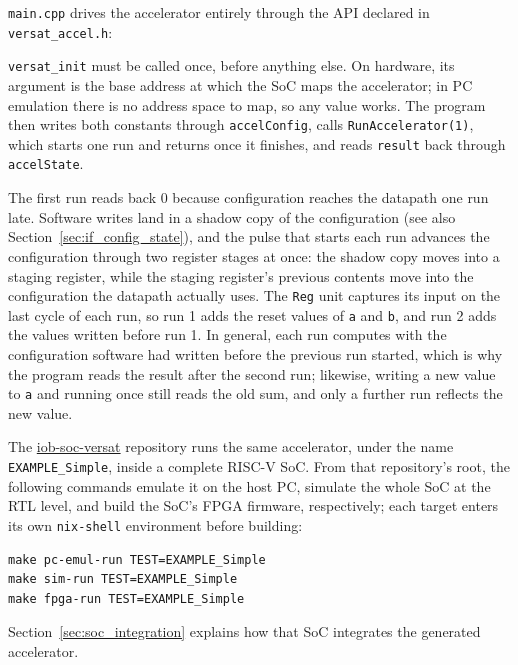 %

\texttt{main.cpp} drives the accelerator entirely through the API declared in \texttt{versat\_accel.h}:



\texttt{versat\_init} must be called once, before anything else. On hardware, its argument is the base address at which the SoC maps the accelerator; in PC emulation there is no address space to map, so any value works. The program then writes both constants through \texttt{accelConfig}, calls \texttt{RunAccelerator(1)}, which starts one run and returns once it finishes, and reads \texttt{result} back through \texttt{accelState}.

The first run reads back 0 because configuration reaches the datapath one run late. Software writes land in a shadow copy of the configuration (see also Section~\ref{sec:if_config_state}), and the pulse that starts each run advances the configuration through two register stages at once: the shadow copy moves into a staging register, while the staging register's previous contents move into the configuration the datapath actually uses. The \texttt{Reg} unit captures its input on the last cycle of each run, so run 1 adds the reset values of \texttt{a} and \texttt{b}, and run 2 adds the values written before run 1. In general, each run computes with the configuration software had written before the previous run started, which is why the program reads the result after the second run; likewise, writing a new value to \texttt{a} and running once still reads the old sum, and only a further run reflects the new value.

The \href{https://github.com/IObundle/iob-soc-versat}{iob-soc-versat} repository runs the same accelerator, under the name \texttt{EXAMPLE\_Simple}, inside a complete RISC-V SoC. From that repository's root, the following commands emulate it on the host PC, simulate the whole SoC at the RTL level, and build the SoC's FPGA firmware, respectively; each target enters its own \texttt{nix-shell} environment before building:

\begin{lstlisting}
make pc-emul-run TEST=EXAMPLE_Simple
make sim-run TEST=EXAMPLE_Simple
make fpga-run TEST=EXAMPLE_Simple
\end{lstlisting}

Section~\ref{sec:soc_integration} explains how that SoC integrates the generated accelerator.
